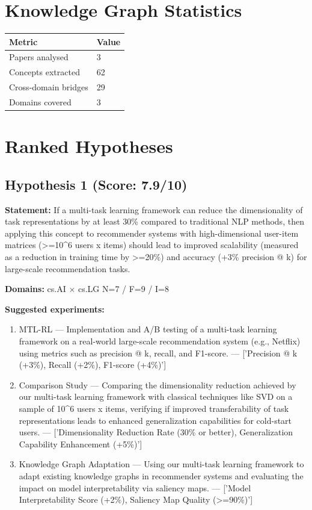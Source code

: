 \documentclass[12pt,a4paper]{article}
\begin{document}
\section{Knowledge Graph Statistics}

\begin{tabular}{ll}
\toprule
Metric & Value \\
\midrule
Papers analysed   & 3 \\
Concepts extracted & 62 \\
Cross-domain bridges & 29 \\
Domains covered   & 3 \\
\bottomrule
\end{tabular}

\section{Ranked Hypotheses}

\subsection*{Hypothesis 1 (Score: 7.9/10)}

\textbf{Statement:} If a multi-task learning framework can reduce the dimensionality of task representations by at least 30\% compared to traditional NLP methods, then applying this concept to recommender systems with high-dimensional user-item matrices (>=10\textasciicircum{}6 users x items) should lead to improved scalability (measured as a reduction in training time by >=20\%) and accuracy (+3\% precision @ k) for large-scale recommendation tasks.

\noindent\textbf{Domains:} cs.AI $\times$ cs.LG
\hspace{1em} N=7 / F=9 / I=8

\textbf{Suggested experiments:}
\begin{enumerate}
  \item MTL-RL — Implementation and A/B testing of a multi-task learning framework on a real-world large-scale recommendation system (e.g., Netflix) using metrics such as precision @ k, recall, and F1-score. — ['Precision @ k (+3\%), Recall (+2\%), F1-score (+4\%)']
  \item Comparison Study — Comparing the dimensionality reduction achieved by our multi-task learning framework with classical techniques like SVD on a sample of 10\textasciicircum{}6 users x items, verifying if improved transferability of task representations leads to enhanced generalization capabilities for cold-start users. — ['Dimensionality Reduction Rate (30\% or better), Generalization Capability Enhancement (+5\%)']
  \item Knowledge Graph Adaptation — Using our multi-task learning framework to adapt existing knowledge graphs in recommender systems and evaluating the impact on model interpretability via saliency maps. — ['Model Interpretability Score (+2\%), Saliency Map Quality (>=90\%)']
\end{enumerate}
\end{document}
